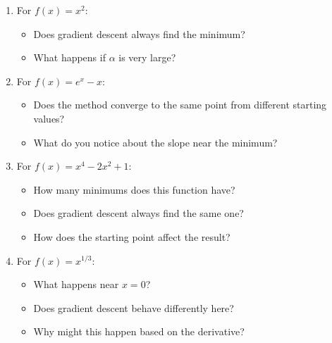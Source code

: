 \documentclass[11pt]{article}
\begin{document}
\begin{enumerate}

    \item For $f(x) = x^2$:
    \begin{itemize}
        \item Does gradient descent always find the minimum?
         \vspace{2cm}
        
        \item What happens if $\alpha$ is very large?
    \end{itemize}
    \vspace{2cm}

    \item For $f(x) = e^x - x$:
    \begin{itemize}
        \item Does the method converge to the same point from different starting values?
        \vspace{2cm}
        
        \item What do you notice about the slope near the minimum?
    \end{itemize}
    \vspace{2cm}

    \item For $f(x) = x^4 - 2x^2 + 1$:
    \begin{itemize}
        \item How many minimums does this function have?
         \vspace{2cm}
        
        \item Does gradient descent always find the same one?
         \vspace{2cm}
        
        \item How does the starting point affect the result?
    \end{itemize}
    \vspace{2cm}

    \item For $f(x) = x^{1/3}$:
    \begin{itemize}
        \item What happens near $x = 0$?
         \vspace{2cm}
        
        \item Does gradient descent behave differently here?
         \vspace{2cm}
        
        \item Why might this happen based on the derivative?
    \end{itemize}
    \vspace{2cm}

\end{enumerate}
\end{document}
